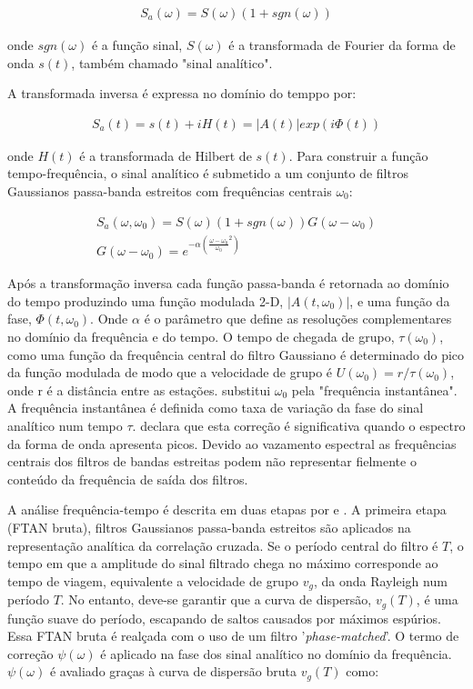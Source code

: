 \documentclass[paper,twocolumn]{geophysics}
\begin{document}
\begin{eqnarray}
S_{a}(\omega) = S(\omega)(1 + sgn(\omega))
\end{eqnarray}

onde $sgn(\omega)$ é a função sinal, $S(\omega)$ é a transformada de Fourier da forma de onda $s(t)$, também chamado "sinal analítico".

A transformada inversa é expressa no domínio do temppo por:

\begin{eqnarray}
S_{a}(t) = s(t) + iH(t) = \left | A(t) \right |exp(i\Phi(t))
\end{eqnarray}

onde $H(t)$ é a transformada de Hilbert de $s(t)$. Para construir a função tempo-frequência, o sinal analítico é submetido a um conjunto de filtros Gaussianos passa-banda estreitos com frequências centrais $\omega _{0}$:

\begin{eqnarray}
S_{a}(\omega,\omega _{0}) = S(\omega)(1 + sgn(\omega))G(\omega - \omega _{0})
\\
G(\omega - \omega _{0}) = e^{-\alpha(\frac{\omega - \omega _{0}}{\omega _{0}}^{2})}
\end{eqnarray}

Após a transformação inversa cada função passa-banda é retornada ao domínio do tempo produzindo uma função modulada 2-D, $\left | A(t,\omega _{0}) \right |$, e uma função da fase, $ \Phi(t,\omega _{0}) $. Onde $\alpha$ é o parâmetro que define as resoluções complementares no domínio da frequência e do tempo. O tempo de chegada de grupo, $\tau (\omega _{0})$, como uma função da frequência central do filtro Gaussiano é determinado do pico da função modulada de modo que a velocidade de grupo é $U(\omega _{0})=r/\tau (\omega _{0})$, onde r é a distância entre as estações. \cite{bensen_processing_2007} substitui $\omega _{0}$ pela "frequência instantânea". A frequência instantânea é definida como taxa de variação da fase do sinal analítico num tempo $\tau$. \cite{bensen_processing_2007} declara que esta correção é significativa quando o espectro da forma de onda apresenta picos. Devido ao vazamento espectral as frequências centrais dos filtros de bandas estreitas podem não representar fielmente o conteúdo da frequência de saída dos filtros.

A análise frequência-tempo é descrita em duas etapas por \cite{levshin_peculiarities_1992} e \cite{bensen_processing_2007}. A primeira etapa (FTAN bruta), filtros Gaussianos passa-banda estreitos são aplicados na representação analítica da correlação cruzada. Se o período central do filtro é $T$, o tempo em que a amplitude do sinal filtrado chega no máximo corresponde ao tempo de viagem, equivalente a velocidade de grupo $v_{g}$, da onda Rayleigh num período $T$. No entanto, deve-se garantir que a curva de dispersão, $v_{g}(T)$, é uma função suave do período, escapando de saltos causados por máximos espúrios. Essa FTAN bruta é realçada com o uso de um filtro '\textit{phase-matched}'. O termo de correção $\psi(\omega)$ é aplicado na fase dos sinal analítico no domínio da frequência. $\psi(\omega)$ é avaliado graças à curva de dispersão bruta $v_{g}(T)$ como:
\end{document}
